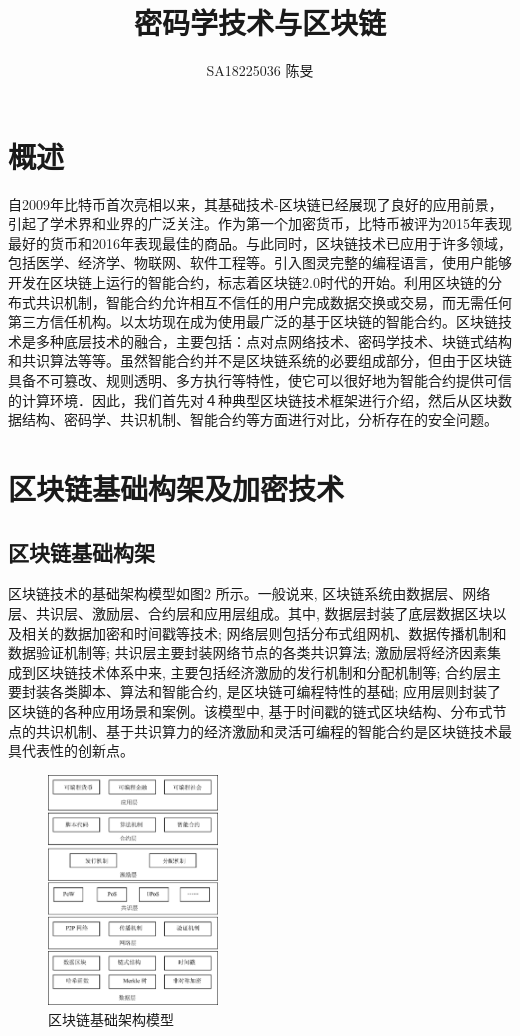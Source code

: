 \documentclass[UTF8,a4paper,10pt, twocolumn]{ctexart}
\title{密码学技术与区块链}
\author{ SA18225036 陈旻 }
\date{}
\begin{document}
    \maketitle
    \thispagestyle{fancy}
\section{概述} \label{sec:one}
自2009年比特币首次亮相以来，其基础技术-区块链已经展现了良好的应用前景，引起了学术界和业界的广泛关注。作为第一个加密货币，比特币被评为2015年表现最好的货币和2016年表现最佳的商品。与此同时，区块链技术已应用于许多领域，包括医学、经济学、物联网、软件工程等。引入图灵完整的编程语言，使用户能够开发在区块链上运行的智能合约，标志着区块链2.0时代的开始。利用区块链的分布式共识机制，智能合约允许相互不信任的用户完成数据交换或交易，而无需任何第三方信任机构。以太坊现在成为使用最广泛的基于区块链的智能合约。区块链技术是多种底层技术的融合，主要包括：点对点网络技术、密码学技术、块链式结构和共识算法等等。虽然智能合约并不是区块链系统的必要组成部分，但由于区块链具备不可篡改、规则透明、多方执行等特性，使它可以很好地为智能合约提供可信的计算环境．因此，我们首先对４种典型区块链技术框架进行介绍，然后从区块数据结构、密码学、共识机制、智能合约等方面进行对比，分析存在的安全问题。

\section{区块链基础构架及加密技术} \label{sec:two}
\subsection{区块链基础构架}
区块链技术的基础架构模型如图2 所示。一般说来, 区块链系统由数据层、网络层、共识层、激励层、合约层和应用层组成。其中, 数据层封装了底层数据区块以及相关的数据加密和时间戳等技术; 网络层则包括分布式组网机、数据传播机制和数据验证机制等; 共识层主要封装网络节点的各类共识算法; 激励层将经济因素集成到区块链技术体系中来, 主要包括经济激励的发行机制和分配机制等; 合约层主要封装各类脚本、算法和智能合约, 是区块链可编程特性的基础; 应用层则封装了区块链的各种应用场景和案例。该模型中, 基于时间戳的链式区块结构、分布式节点的共识机制、基于共识算力的经济激励和灵活可编程的智能合约是区块链技术最具代表性的创新点。
\begin{figure}[htbp]
	\centering
	\includegraphics[width=0.4\textwidth]{fig/basearc.png}
	\caption{区块链基础架构模型}
\end{figure}
\end{document}
